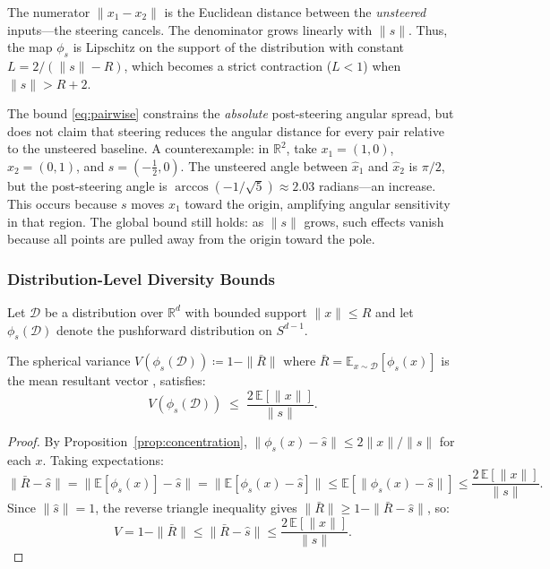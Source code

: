 \noindent
The numerator $\|x_1 - x_2\|$ is the Euclidean distance between the
\emph{unsteered} inputs---the steering cancels.
The denominator grows linearly with $\|s\|$.
Thus, the map $\phi_s$ is Lipschitz on the support of the distribution
with constant $L = 2/(\|s\| - R)$, which becomes a strict contraction
($L < 1$) when $\|s\| > R + 2$.

\begin{remark}
\label{rem:non-monotone}
The bound \eqref{eq:pairwise} constrains the \emph{absolute} post-steering
angular spread, but does not claim that steering reduces the angular distance
for every pair relative to the unsteered baseline.
A counterexample: in $\mathbb{R}^2$, take $x_1 = (1, 0)$, $x_2 = (0, 1)$,
and $s = (-\tfrac{1}{2}, 0)$.
The unsteered angle between $\hat{x}_1$ and $\hat{x}_2$ is $\pi/2$, but the
post-steering angle is $\arccos(-1/\sqrt{5}) \approx 2.03$ radians---an increase.
This occurs because $s$ moves $x_1$ toward the origin, amplifying angular
sensitivity in that region.
The global bound still holds: as $\|s\|$ grows, such effects vanish because
all points are pulled away from the origin toward the pole.
\end{remark}

\subsubsection{Distribution-Level Diversity Bounds}

Let $\mathcal{D}$ be a distribution over $\mathbb{R}^d$ with bounded support
$\|x\| \leq R$ and let $\phi_s(\mathcal{D})$ denote the pushforward
distribution on $S^{d-1}$.

\begin{corollary}
\label{cor:spherical-variance}
The spherical variance
$V(\phi_s(\mathcal{D})) \coloneqq 1 - \|\bar{R}\|$
where $\bar{R} = \mathbb{E}_{x \sim \mathcal{D}}[\phi_s(x)]$
is the mean resultant vector \citep{mardia2000directional}, satisfies:
%
\begin{equation}
  V(\phi_s(\mathcal{D}))
  \;\leq\;
  \frac{2\,\mathbb{E}[\|x\|]}{\|s\|}.
  \label{eq:spherical-variance-bound}
\end{equation}
\end{corollary}

\begin{proof}
By Proposition~\ref{prop:concentration}, $\|\phi_s(x) - \hat{s}\| \leq 2\|x\|/\|s\|$ for each $x$.
Taking expectations:
%
\begin{equation}
  \|\bar{R} - \hat{s}\|
  = \|\mathbb{E}[\phi_s(x)] - \hat{s}\|
  = \|\mathbb{E}[\phi_s(x) - \hat{s}]\|
  \leq \mathbb{E}[\|\phi_s(x) - \hat{s}\|]
  \leq \frac{2\,\mathbb{E}[\|x\|]}{\|s\|}.
\end{equation}
%
Since $\|\hat{s}\| = 1$, the reverse triangle inequality gives
$\|\bar{R}\| \geq 1 - \|\bar{R} - \hat{s}\|$, so:
%
\begin{equation}
  V = 1 - \|\bar{R}\| \leq \|\bar{R} - \hat{s}\| \leq \frac{2\,\mathbb{E}[\|x\|]}{\|s\|}.
\end{equation}
\end{proof}

